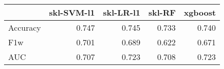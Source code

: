 \begin{tabular}{lrrrr}
\toprule
{} &  skl-SVM-l1 &  skl-LR-l1 &  skl-RF &  xgboost \\
\midrule
Accuracy &       0.747 &      0.745 &   0.733 &    0.740 \\
F1w      &       0.701 &      0.689 &   0.622 &    0.671 \\
AUC      &       0.707 &      0.723 &   0.708 &    0.723 \\
\bottomrule
\end{tabular}
